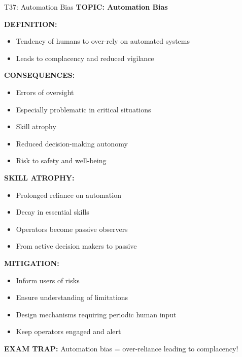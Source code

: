 \documentclass[8pt]{beamer}
\begin{document}
	\begin{frame}{T37: Automation Bias}
		\fontsize{6.5}{7.5}\selectfont
		\textbf{TOPIC: Automation Bias}
		
		\vspace{0.1cm}
		\textbf{DEFINITION:}
		\begin{itemize}
			\item Tendency of humans to over-rely on automated systems
			\item Leads to complacency and reduced vigilance
		\end{itemize}
		
		\vspace{0.1cm}
		\textbf{CONSEQUENCES:}
		\begin{itemize}
			\item Errors of oversight
			\item Especially problematic in critical situations
			\item Skill atrophy
			\item Reduced decision-making autonomy
			\item Risk to safety and well-being
		\end{itemize}
		
		\vspace{0.1cm}
		\textbf{SKILL ATROPHY:}
		\begin{itemize}
			\item Prolonged reliance on automation
			\item Decay in essential skills
			\item Operators become passive observers
			\item From active decision makers to passive
		\end{itemize}
		
		\vspace{0.1cm}
		\textbf{MITIGATION:}
		\begin{itemize}
			\item Inform users of risks
			\item Ensure understanding of limitations
			\item Design mechanisms requiring periodic human input
			\item Keep operators engaged and alert
		\end{itemize}
		
		\textcolor{myred}{\textbf{EXAM TRAP:}} Automation bias = \textcolor{myblue}{over-reliance leading to complacency}!
	\end{frame}
	
\end{document}
